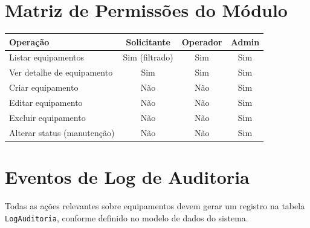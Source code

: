 \documentclass[12pt, a4paper]{article}
\begin{document}
\section{Matriz de Permissões do Módulo}

\begin{center}
\begin{tabular}{lccc}
  \toprule
  \textbf{Operação}            & \textbf{Solicitante} & \textbf{Operador} & \textbf{Admin} \\
  \midrule
  Listar equipamentos          & \textcolor{okgreen}{Sim (filtrado)} & \textcolor{okgreen}{Sim} & \textcolor{okgreen}{Sim} \\
  Ver detalhe de equipamento   & \textcolor{okgreen}{Sim}            & \textcolor{okgreen}{Sim} & \textcolor{okgreen}{Sim} \\
  Criar equipamento            & \textcolor{alertred}{Não}           & \textcolor{alertred}{Não} & \textcolor{okgreen}{Sim} \\
  Editar equipamento           & \textcolor{alertred}{Não}           & \textcolor{alertred}{Não} & \textcolor{okgreen}{Sim} \\
  Excluir equipamento          & \textcolor{alertred}{Não}           & \textcolor{alertred}{Não} & \textcolor{okgreen}{Sim} \\
  Alterar status (manutenção)  & \textcolor{alertred}{Não}           & \textcolor{alertred}{Não} & \textcolor{okgreen}{Sim} \\
  \bottomrule
\end{tabular}
\end{center}

\section{Eventos de Log de Auditoria}

Todas as ações relevantes sobre equipamentos devem gerar um registro na tabela
\texttt{LogAuditoria}, conforme definido no modelo de dados do sistema.
\end{document}
